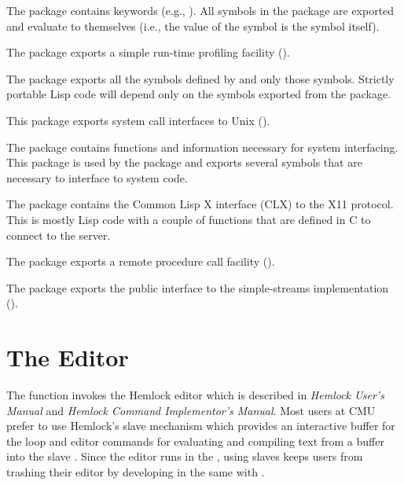 \begin{Lentry}
\item[\code{keyword}] The  package contains keywords
  (e.g., ).  All symbols in the  package are
  exported and evaluate to themselves (i.e., the value of the symbol
  is the symbol itself).
  
\item[\code{profile}] The  package exports a simple
  run-time profiling facility ().
  
\item[\code{common-lisp (cl)}] The  package
  exports all the symbols defined by \cltl{} and only those symbols.
  Strictly portable Lisp code will depend only on the symbols exported
  from the  package.
  
\item[\code{unix}] This package exports system call
  interfaces to Unix ().
  
\item[\code{system (sys)}] The  package contains
  functions and information necessary for system interfacing.  This
  package is used by the  package and exports several
  symbols that are necessary to interface to system code.
  
\item[\code{xlib}] The  package contains the Common Lisp X
  interface (CLX) to the X11 protocol.  This is mostly Lisp code with
  a couple of functions that are defined in C to connect to the
  server.
  
\item[\code{wire}] The  package exports a remote procedure
  call facility ().

\item[\code{stream}] The  package exports the public
  interface to the simple-streams implementation ().
\end{Lentry}








\section{The Editor}

The  function invokes the Hemlock editor which is described
in {\it Hemlock User's Manual} and {\it Hemlock Command Implementor's
Manual}. Most users at CMU prefer to use Hemlock's slave \llisp{}
mechanism which provides an interactive buffer for the
 loop and editor commands for evaluating and
compiling text from a buffer into the slave \llisp.  Since the editor
runs in the \llisp, using slaves keeps users from trashing their
editor by developing in the same \llisp{} with \hemlock{}.


